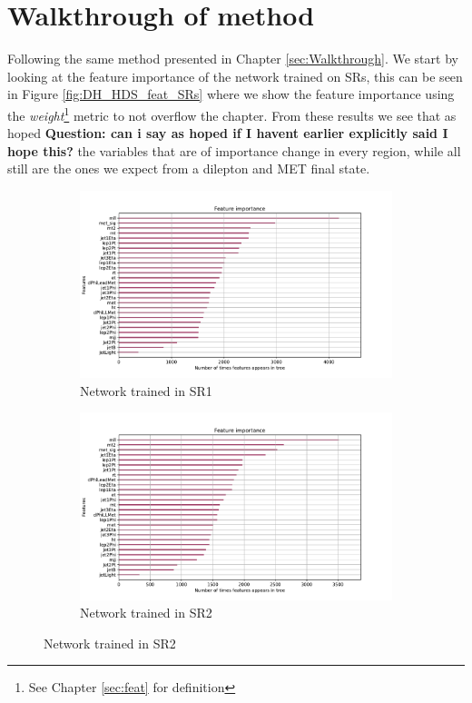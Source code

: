 \documentclass[12pt, a4paper]{book}
\begin{document}
\section{Walkthrough of method}
Following the same method presented in Chapter \ref{sec:Walkthrough}. We start by looking at the feature importance of the network trained on SRs, this can be seen in Figure \ref{fig:DH_HDS_feat_SRs} where we show the feature importance using the \textit{weight}\footnote{See Chapter \ref{sec:feat} for definition} metric to not overflow the chapter. 
From these results we see that as hoped \textbf{Question: can i say as hoped if I havent earlier explicitly said I hope this?} the variables that are of importance change in every region, while all still are the ones we expect from a dilepton and MET final state.\\
\begin{figure}[!ht]
	\centering
	\begin{subfigure}[b]{0.7\textwidth}
      \centering
      \includegraphics[width=1\textwidth]{XGBoost/Model_independent/50-100/feature_importance/weight.pdf}\caption{Network trained in SR1}
      \end{subfigure}
      \hfill
      \begin{subfigure}[b]{0.7\textwidth}
         \centering
         \includegraphics[width=1\textwidth]{XGBoost/Model_independent/100-150/feature_importance/weight.pdf}\caption{Network trained in SR2}

\end{subfigure}
\end{figure}
\end{document}
